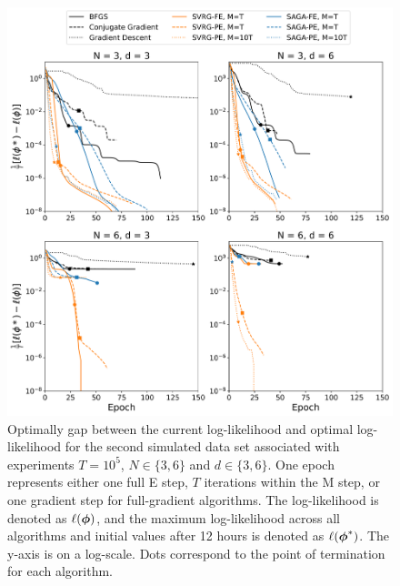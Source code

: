\documentclass[12pt]{article}
\begin{document}
\begin{figure}[H]
    \centering
    \includegraphics[width=6.5in]{../plt/log-like_v_epoch_T-100000-001.png}
    \caption{Optimally gap between the current log-likelihood and optimal log-likelihood for the second simulated data set associated with experiments $T=10^{5}$, $N \in \{3,6\}$ and $d \in \{3,6\}$. One epoch represents either one full E step, $T$ iterations within the M step, or one gradient step for full-gradient algorithms. The log-likelihood is denoted as $\ell(\boldsymbol{\phi})$, and the maximum log-likelihood across all algorithms and initial values after 12 hours is denoted as $\ell(\boldsymbol{\phi}^*)$. The y-axis is on a log-scale. Dots correspond to the point of termination for each algorithm.}
\end{figure}
%
\end{document}
